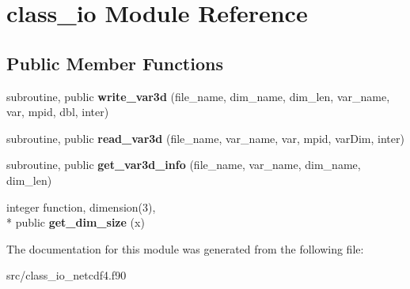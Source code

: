 \hypertarget{classclass__io}{\section{class\-\_\-io Module Reference}
\label{classclass__io}
}
\subsection*{Public Member Functions}
\begin{DoxyCompactItemize}
\item 
\hypertarget{classclass__io_a26136873649a8787e869309b723b7cac}{subroutine, public {\bfseries write\-\_\-var3d} (file\-\_\-name, dim\-\_\-name, dim\-\_\-len, var\-\_\-name, var, mpid, dbl, inter)}\label{classclass__io_a26136873649a8787e869309b723b7cac}

\item 
\hypertarget{classclass__io_a5f7b407fab48ea9c0138332ecad6a626}{subroutine, public {\bfseries read\-\_\-var3d} (file\-\_\-name, var\-\_\-name, var, mpid, var\-Dim, inter)}\label{classclass__io_a5f7b407fab48ea9c0138332ecad6a626}

\item 
\hypertarget{classclass__io_acc05fead9210c1f7ba60d688c33babb4}{subroutine, public {\bfseries get\-\_\-var3d\-\_\-info} (file\-\_\-name, var\-\_\-name, dim\-\_\-name, dim\-\_\-len)}\label{classclass__io_acc05fead9210c1f7ba60d688c33babb4}

\item 
\hypertarget{classclass__io_ae7ef6d65b441a42b32fe39f01fd38e86}{integer function, dimension(3), \\*
public {\bfseries get\-\_\-dim\-\_\-size} (x)}\label{classclass__io_ae7ef6d65b441a42b32fe39f01fd38e86}

\end{DoxyCompactItemize}


The documentation for this module was generated from the following file\-:\begin{DoxyCompactItemize}
\item 
src/class\-\_\-io\-\_\-netcdf4.\-f90\end{DoxyCompactItemize}
